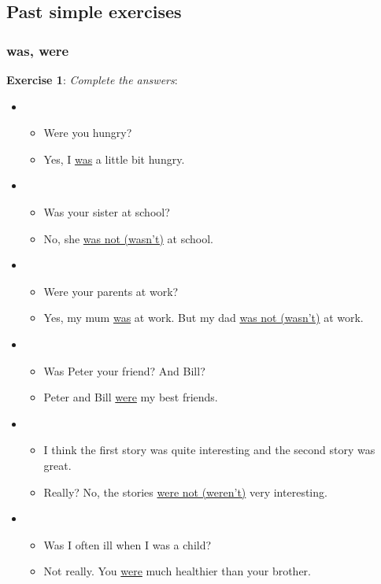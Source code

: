 \subsection{Past simple exercises}

\subsubsection{was, were}

\textbf{Exercise 1}: \textit{Complete the answers}:

\begin{itemize}

\item
\begin{itemize}
\item Were you hungry?
\item Yes, I \underline{was} a little bit hungry.
\end{itemize}

\item
\begin{itemize}
\item Was your sister at school?
\item No, she \underline{was not (wasn't)} at school.
\end{itemize}

\item
\begin{itemize}
\item Were your parents at work?
\item Yes, my mum \underline{was} at work. But my dad \underline{was not (wasn't)} at work.
\end{itemize}

\item
\begin{itemize}
\item Was Peter your friend? And Bill?
\item Peter and Bill \underline{were} my best friends.
\end{itemize}

\item
\begin{itemize}
\item I think the first story was quite interesting and the second story was great.
\item Really? No, the stories \underline{were not (weren't)} very interesting.
\end{itemize}

\item
\begin{itemize}
\item Was I often ill when I was a child?
\item Not really. You \underline{were} much healthier than your brother.
\end{itemize}


\end{itemize}
